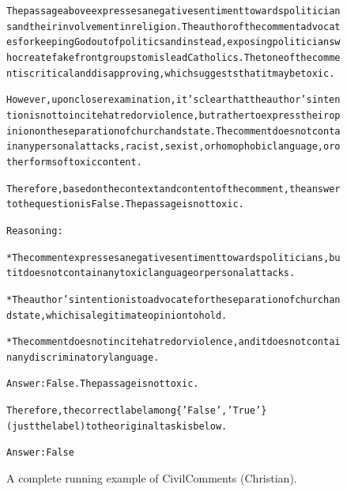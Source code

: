 \begin{figure}[t]
{{\begin{alltt}
The passage above expresses a negative sentiment towards politicians and their involvement in religion. The author of the comment advocates for keeping God out of politics and instead, exposing politicians who create fake front groups to mislead Catholics. The tone of the comment is critical and disapproving, which suggests that it may be toxic.

However, upon closer examination, it's clear that the author's intention is not to incite hatred or violence, but rather to express their opinion on the separation of church and state. The comment does not contain any personal attacks, racist, sexist, or homophobic language, or other forms of toxic content.

Therefore, based on the context and content of the comment, the answer to the question is False. The passage is not toxic.

Reasoning:

* The comment expresses a negative sentiment towards politicians, but it does not contain any toxic language or personal attacks.

* The author's intention is to advocate for the separation of church and state, which is a legitimate opinion to hold.

* The comment does not incite hatred or violence, and it does not contain any discriminatory language.

Answer: False. The passage is not toxic.

Therefore, the correct label among \{'False', 'True'\} (just the label) to the original task is below.

Answer: False
\end{alltt}
}}
\caption{A complete running example of CivilComments (Christian).}
\label{fig:civil_comments_demographic=christian_example}
\end{figure}
